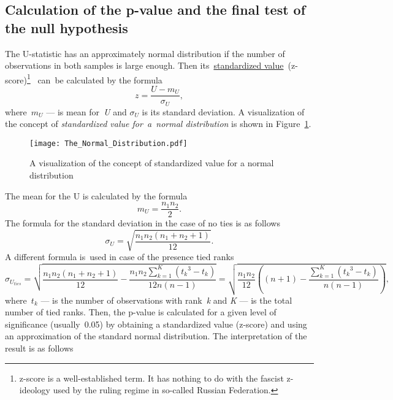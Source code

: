 \documentclass[]{scrreprt}
\begin{document}
\subsection{Calculation of the p-value and the final test of the null hypothesis}
The U-statistic has an approximately normal distribution if the number of observations in both samples is large enough. Then its~\href{https://en.wikipedia.org/wiki/Standard_score}{standardized value}~(z-score)\footnote{z-score is a well-established term. It has nothing to do with the fascist z-ideology used by the ruling regime in so-called Russian Federation.}~\cite{Wiki:z-score} can~be calculated by the formula
\begin{equation}\label{eq:z-score}
z = \frac{U-m_{U}}{\sigma_{U}},
\end{equation}
where~$m_{U}$ --- is mean for~\textit{U} and $\sigma_{U}$ is its standard deviation. A visualization of the concept of \emph{standardized value for~a~normal distribution} is shown in Figure~\ref{fig:z-score}.
%
\begin{figure}[htp]
	\centering
	\texttt{[image: The\_Normal\_Distribution.pdf]}
	\caption{A visualization of the concept of standardized value for a normal distribution \cite{Wiki:z-score}}\label{fig:z-score}
\end{figure}
%
The mean for the U is calculated by the formula
\begin{equation}\label{eq:U-mean}
m_{U} = \frac{n_{1}n_{2}}{2}.
\end{equation}
The formula for the standard deviation in the case of no ties is as follows
\begin{equation}\label{eq:standard-deviation-no-ties}
\sigma_{U} =  \sqrt{\frac{n_{1}n_{2}(n_{1}+n_{2}+1)}{12}}.
\end{equation}
A different formula is~used in case of the presence tied ranks
\begin{equation}\label{eq:standard-deviation-ties}
\sigma_{U_{ties}} = \sqrt{\frac{n_{1}n_{2}(n_{1}+n_{2}+1)}{12} - \frac{n_{1}n_{2}\sum_{k=1}^{K}({t_{k}}^{3} - t_{k})}{12n(n-1)}} = \sqrt{\frac{n_{1}n_{2}}{12} \left((n+1)-\frac{\sum_{k=1}^{K}({t_{k}}^{3} - t_{k})}{n(n-1)}\right)},
\end{equation}
where~$t_{k}$ --- is the number of observations with rank~\textit{k} and \textit{K} --- is the total number of tied ranks. Then, the p-value is calculated for a given level of significance (usually~0.05) by obtaining a standardized value (z-score) and using an approximation of the standard normal distribution. The interpretation of the result is as follows
\end{document}
